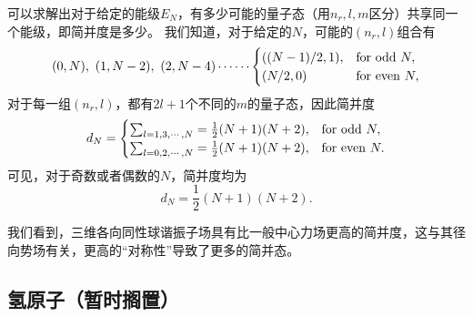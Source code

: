 可以求解出对于给定的能级$E_N$，有多少可能的量子态（用$n_r,l,m$区分）共享同一个能级，即简并度是多少。
我们知道，对于给定的$N$，可能的$(n_r,l)$组合有
\begin{equation}
    (0,N),\ (1,N-2),\ (2,N-4)\cdots\cdots
    \begin{cases}
        ((N-1)/2, 1),   & \rm{for\ odd\ }N, \\
        (N/2, 0)        & \rm{for\ even\ }N, \\
    \end{cases}
\end{equation}
对于每一组$(n_r,l)$，都有$2l+1$个不同的$m$的量子态，因此简并度
\begin{equation}
    d_N =
    \begin{cases}
        \sum_{l=1,3,\cdots,N} = \frac12 (N+1)(N+2), & \rm{for\ odd\ }N, \\
        \sum_{l=0,2,\cdots,N} = \frac12 (N+1)(N+2), & \rm{for\ even\ }N. \\
    \end{cases}
\end{equation}
可见，对于奇数或者偶数的$N$，简并度均为
\begin{equation}
    d_N = \frac12 (N+1)(N+2).
\end{equation}

我们看到，三维各向同性球谐振子场具有比一般中心力场更高的简并度，这与其径向势场有关，更高的“对称性”导致了更多的简并态。

\subsection{氢原子（暂时搁置）}
\label{subsec:cf_hydrogen}

